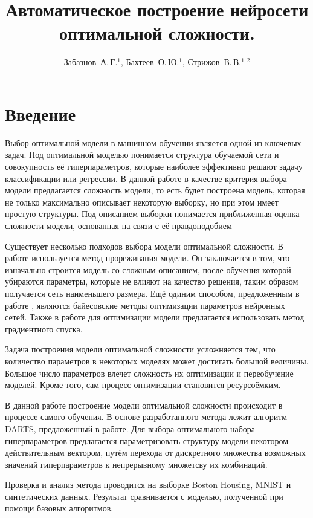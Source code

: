\documentclass[12pt,twoside]{article}
\title
    [Автоматическое построение нейросети оптимальной сложности ] %
    {Автоматическое построение нейросети оптимальной сложности. }
\author
    {Забазнов~А.\,Г.$^1$, Бахтеев~О.\,Ю.$^1$, Стрижов~В.\,В.$^{1, 2}$} %
\begin{document}
\maketitle


\section{Введение}
Выбор оптимальной модели в машинном обучении является одной из ключевых задач.
Под оптимальной моделью понимается структура обучаемой сети и совокупность её гиперпараметров, которые наиболее эффективно решают задачу классификации или регрессии. В данной работе в качестве критерия выбора модели предлагается
сложность модели, то есть будет построена модель, которая не только максимально описывает некоторую выборку, но при этом имеет простую структуры. Под описанием выборки понимается приближенная оценка сложности модели, основанная на связи с её правдоподобием\cite{DescriptionLength}

Существует несколько подходов выбора модели оптимальной сложности. В работе \cite{BrainDamage} используется метод прореживания модели. Он заключается в том, что изначально строится модель со сложным описанием, после обучения которой убираются параметры, которые не влияют на качество решения, таким образом получается сеть наименьшего размера. Ещё одиним способом, предложенным в работе \cite{BayesOptim}, являются байесовские методы оптимизации параметров нейронных сетей. Также в работе\cite{GradientOptim} для оптимизации модели предлагается использовать метод градиентного спуска. 

Задача построения модели оптимальной сложности усложняется тем, что количество параметров в некоторых моделях может достигать большой величины.
Большое число параметров влечет сложность их оптимизации и переобучение
моделей. Кроме того, сам процесс оптимизации становится ресурсоёмким.

В данной работе построение модели оптимальной сложности происходит в процессе самого обучения. В основе разработанного метода лежит алгоритм DARTS, предложенный в работе\cite{DARTS}. Для выбора оптимального набора гиперпараметров предлагается  параметризовать структуру
модели некотором действительным вектором, путём перехода от дискретного множества возможных значений гиперпараметров к непрерывному множетсву их комбинаций.

Проверка и анализ метода проводится на выборке Boston Housing\cite{Boston}, MNIST\cite{MNIST} и синтетических данных. Результат сравнивается с моделью, полученной при помощи базовых алгоритмов.
\end{document}
